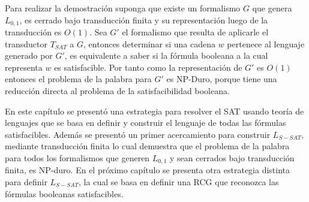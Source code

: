 Para realizar la demostración suponga que existe un formalismo $G$ que genera $L_{0,1}$, es cerrado bajo transducción finita y su representación
luego de la transducción es $O(1)$.
Sea $G'$ el formalismo que resulta de aplicarle el transductor $T_{SAT}$ a $G$, entonces determinar
si una cadena $w$ pertenece al lenguaje generado por $G'$, es equivalente a saber si la fórmula
booleana a la cual representa $w$ es satisfacible. Por tanto como la representación de $G'$ es $O(1)$
entonces el problema de la palabra para $G'$ es NP-Duro, porque tiene una reducción directa al problema
de la satisfacibilidad booleana.

En este capítulo se presentó una estrategia para resolver el SAT usando teoría de lenguajes que se basa en
definir y construir el lenguaje de todas las fórmulas satisfacibles. Además se presentó un primer acercamiento
para construir $L_{S-SAT}$, mediante transducción finita lo cual demuestra que el problema de la palabra para
todos los formalismos que generen $L_{0,1}$ y sean cerrados bajo transducción finita, es NP-duro.
En el próximo capítulo se presenta otra estrategia distinta para definir $L_{S-SAT}$, la cual se
basa en definir una RCG que reconozca las fórmulas booleanas satisfacibles.
